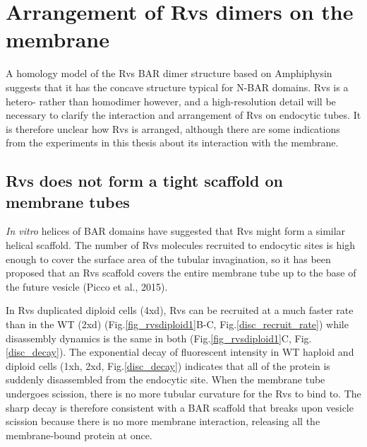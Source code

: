 


\section{Arrangement of Rvs dimers on the membrane}
A homology model of the Rvs BAR dimer structure based on Amphiphysin suggests that it has the concave structure typical for N-BAR domains. Rvs is a hetero- rather than homodimer however, and a high-resolution detail will be necessary to clarify the interaction and arrangement of Rvs on endocytic tubes. It is therefore unclear how Rvs is arranged, although there are some indications from the experiments in this thesis about its interaction with the membrane.



\subsection{Rvs does not form a tight scaffold on membrane tubes}
\textit{In vitro} helices of BAR domains have suggested that Rvs might form a similar helical scaffold. The number of Rvs molecules recruited to endocytic sites is high enough to cover the surface area of the tubular invagination, so it has been proposed that an Rvs scaffold covers the entire membrane tube up to the base of the future vesicle (Picco et al., 2015). 

	\vspace{5mm}
In Rvs duplicated diploid cells (4xd), Rvs can be recruited at a much faster rate than in the WT (2xd) (Fig.\ref{fig_rvsdiploid1}B-C, Fig.\ref{disc_recruit_rate}) while disassembly dynamics is the same in both (Fig.\ref{fig_rvsdiploid1}C, Fig.\ref{disc_decay}). The exponential decay of fluorescent intensity in WT haploid and diploid cells (1xh, 2xd, Fig.\ref{disc_decay}) indicates that all of the protein is suddenly disassembled from the endocytic site. When the membrane tube undergoes scission, there is no more tubular curvature for the Rvs to bind to. The sharp decay is therefore consistent with a BAR scaffold that breaks upon vesicle scission because there is no more membrane interaction, releasing all the membrane-bound protein at once. 



